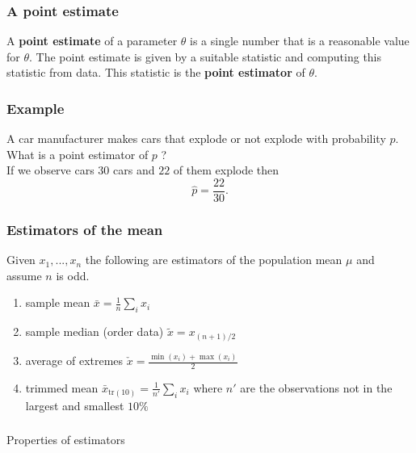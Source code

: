 \begin{frame}[fragile]\frametitle{A point estimate}

\begin{defn}
A {\bf point estimate} of a parameter $\theta$ is a single number
that is a reasonable value for $\theta$. The point estimate is 
given by a suitable statistic and computing this statistic
from data. This statistic is the {\bf point estimator} of $\theta$.

\end{defn}

\end{frame}

\begin{frame}[fragile]\frametitle{Example}

A car manufacturer makes cars that explode or not explode
with probability $p$. \\ 

What is a point estimator of $p$ ? \\ 

If we observe cars $30$ cars and $22$ of them
explode then\\
$$ \hat{p} = \frac{22}{30}.$$ 

\end{frame}


\begin{frame}[fragile]\frametitle{Estimators of the mean}

Given $x_1,...,x_n$
the following are estimators of the population mean
$\mu$ and assume $n$ is odd.

\begin{enumerate}

\item sample mean $\bar{x} = \frac{1}{n} \sum_i x_i$  

\item sample median (order data)  $\tilde{x} = x_{(n+1)/2}$  

\item average of extremes $\check{x} = \frac{\min(x_i) +
    \max(x_i)}{2}$ 

\item trimmed mean $\bar{x}_{\mbox{tr}(10)} = \frac{1}{n'} \sum_i x_i$
where $n'$ are the observations not in the largest and smallest
$10\%$
\end{enumerate}
 
\end{frame}

\begin{frame}[fragile]\frametitle{}
\begin{center}
{\Large Properties of estimators}

\end{center}
\end{frame}


